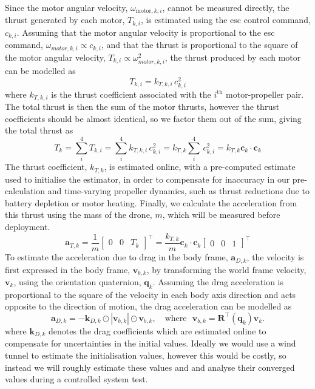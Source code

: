 \documentclass{report_template_oxford}
\begin{document}
Since the motor angular velocity, $\omega_{\mathrm{motor},k,i}$, cannot be measured directly, the thrust generated by each motor, $T_{k,i}$, is estimated using the \gls{esc} control command, $c_{k,i}$. Assuming that the motor angular velocity is proportional to the \gls{esc} command, $\omega_{motor,k,i} \propto c_{k,i}$, and that the thrust is proportional to the square of the motor angular velocity, $T_{k,i} \propto \omega_{motor,k,i}^2$, the thrust produced by each motor can be modelled as
\begin{equation} \label{equ:ActuatorThrustModel}
    T_{k,i} = k_{T,k,i} \, c_{k,i}^{2}
\end{equation}
where $k_{T,k,i}$ is the thrust coefficient associated with the $i^{\mathrm{th}}$ motor-propeller pair. The total thrust is then the sum of the motor thrusts, however the thrust coefficients should be almost identical, so we factor them out of the sum, giving the total thrust as
\begin{equation}
    T_{k} = \sum_i^4 T_{k,i} = \sum_i^4k_{T,k,i} \, c_{k,i}^{2} = k_{T,k} \sum_i^4 \, c_{k,i}^{2} = k_{T,k}\mathbf{c}_{k} \cdot \mathbf{c}_{k}
\end{equation}
The thrust coefficient, $k_{T,k}$, is estimated online, with a pre-computed estimate used to initialise the estimator, in order to compensate for inaccuracy in our pre-calculation and time-varying propeller dynamics, such as thrust reductions due to battery depletion or motor heating. Finally, we calculate the acceleration from this thrust using the mass of the drone, $m$, which will be measured before deployment.
\begin{equation} \label{equ:EstThrustAccel}
    \mathbf{a}_{T,k} = \frac{1}{m} \begin{bmatrix} 0 & 0 & T_k \end{bmatrix}^\top = \frac{k_{T,k}}{m}\mathbf{c}_{k} \cdot \mathbf{c}_{k} \begin{bmatrix} 0 & 0 & 1 \end{bmatrix}^\top
\end{equation}
To estimate the acceleration due to drag in the body frame, $\mathbf{a}_{D,k}$, the velocity is first expressed in the body frame, $\mathbf{v}_{b,k}$, by transforming the world frame velocity, $\mathbf{v}_k$, using the orientation quaternion, $\mathbf{q}_k$. Assuming the drag acceleration is proportional to the square of the velocity in each body axis direction and acts opposite to the direction of motion, the drag acceleration can be modelled as
\begin{equation} \label{equ:EstDragAccel}
\mathbf{a}_{D,k}
=
-\mathbf{k}_{D,k}
\odot
|\mathbf{v}_{b,k}|
\odot
\mathbf{v}_{b,k},
\quad
\text{where}
\ \ \
\mathbf{v}_{b,k} = \mathbf{R}^\top(\mathbf{q}_k)\mathbf{v}_k.
\end{equation}
where $\mathbf{k}_{D,k}$ denotes the drag coefficients which are estimated online to compensate for uncertainties in the initial values. Ideally we would use a wind tunnel to estimate the initialisation values, however this would be costly, so instead we will roughly estimate these values and and analyse their converged values during a controlled system test.
\end{document}
